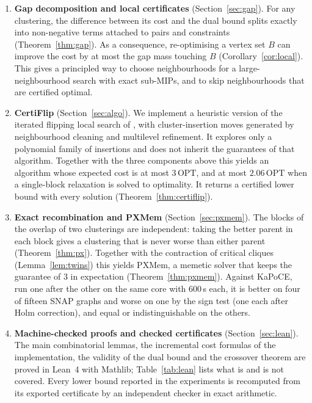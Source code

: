 \documentclass[11pt]{article}
\theoremstyle{definition}
\newcommand{\OPT}{\mathrm{OPT}}
\begin{document}
\begin{enumerate}
\item \textbf{Gap decomposition and local certificates}
(Section~\ref{sec:gap}).  For any clustering, the difference between its cost
and the dual bound splits exactly into non-negative terms attached to pairs
and constraints (Theorem~\ref{thm:gap}).  As a consequence, re-optimising a
vertex set $B$ can improve the cost by at most the gap mass touching $B$
(Corollary~\ref{cor:local}).  This gives a principled way to choose
neighbourhoods for a large-neighbourhood search with exact sub-MIPs, and to
skip neighbourhoods that are certified optimal.

\item \textbf{CertiFlip} (Section~\ref{sec:algo}).  We implement a heuristic
version of the iterated flipping local search of \citet{CohenAddadLPTYZ24},
with cluster-insertion moves generated by neighbourhood cleaning and
multilevel refinement.  It explores only a polynomial family of insertions and
does not inherit the guarantees of that algorithm.  Together
with the three components above this yields an algorithm whose expected cost
is at most $3\,\OPT$, and at most $2.06\,\OPT$ when a single-block relaxation
is solved to optimality.  It returns a certified lower bound with every
solution (Theorem~\ref{thm:certiflip}).

\item \textbf{Exact recombination and PXMem} (Section~\ref{sec:pxmem}).  The
blocks of the overlap of two clusterings are independent: taking the better
parent in each block gives a clustering that is never worse than either
parent (Theorem~\ref{thm:px}).  Together with the contraction of critical
cliques (Lemma~\ref{lem:twins}) this yields PXMem, a memetic solver that keeps
the guarantee of $3$ in expectation (Theorem~\ref{thm:pxmem}).  Against KaPoCE,
run one after the other on the same core with 600\,s each, it is better on
four of fifteen SNAP graphs and worse on one by the sign test (one each after
Holm correction), and equal or indistinguishable on the others.

\item \textbf{Machine-checked proofs and checked certificates}
(Section~\ref{sec:lean}).  The main combinatorial lemmas, the incremental
cost formulas of the implementation, the validity of the dual bound and the
crossover theorem are proved in Lean~4 with Mathlib; Table~\ref{tab:lean}
lists what is and is not covered.  Every lower bound reported in the
experiments is recomputed from its exported certificate by an independent
checker in exact arithmetic.


\end{enumerate}
\end{document}
